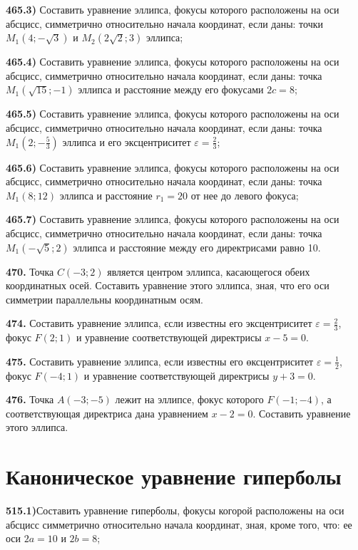 \textbf{465.3)} Составить уравнение эллипса, фокусы которого расположены на оси абсцисс, симметрично относительно начала координат, если даны: точки $M_1(4 ;-\sqrt{3})$ и $M_2(2 \sqrt{2} ; 3)$ эллипса;

\textbf{465.4)} Составить уравнение эллипса, фокусы которого расположены на оси абсцисс, симметрично относительно начала координат, если даны: точка $M_1(\sqrt{15} ;-1)$ эллипса и расстояние между его фокусами $2 c=8$;

\textbf{465.5)} Составить уравнение эллипса, фокусы которого расположены на оси абсцисс, симметрично относительно начала координат, если даны: точка $M_1\left(2 ;-\frac{5}{3}\right)$ эллипса и его эксцентриситет $\varepsilon=\frac{2}{3}$;

\textbf{465.6)} Составить уравнение эллипса, фокусы которого расположены на оси абсцисс, симметрично относительно начала координат, если даны: точка $M_1(8 ; 12)$ эллипса и расстояние $r_1=20$ от нее до левого фокуса;

\textbf{465.7)} Составить уравнение эллипса, фокусы которого расположены на оси абсцисс, симметрично относительно начала координат, если даны: точка $M_1(-\sqrt{5} ; 2)$ эллипса и расстояние между его директрисами равно 10.

\textbf{470.} Точка $C(-3 ; 2)$ является центром эллипса, касающегося обеих координатных осей. Составить уравнение этого эллипса, зная, что его оси симметрии параллельны координатным осям.

\textbf{474.} Составить уравнение эллипса, єсли известны его эксцентриситет $\varepsilon=\frac{2}{3}$, фокус $F(2 ; 1)$ и уравнение соответствующей директрисы $x-5=0$.

\textbf{475.} Составить уравнение эллипса, если известны его өксцентриситет $\varepsilon=\frac{1}{2}$, фокус $F(-4 ; 1)$ и уравнение соответствующей директрисы $y+3=0$.

\textbf{476.} Точка $A(-3 ;-5)$ лежит на эллипсе, фокус которого $F(-1 ;-4)$, а соответствующая директриса дана уравнением $x-2=0$. Составить уравнение этого эллипса.



\section{Каноническое уравнение гиперболы}



\textbf{515.1)}Составить уравнение гиперболы, фокусы когорой расположены на оси абсцисс симметрично относительно начала координат, зная, кроме того, что: ее оси $2 a=10$ и $2 b=8$;

